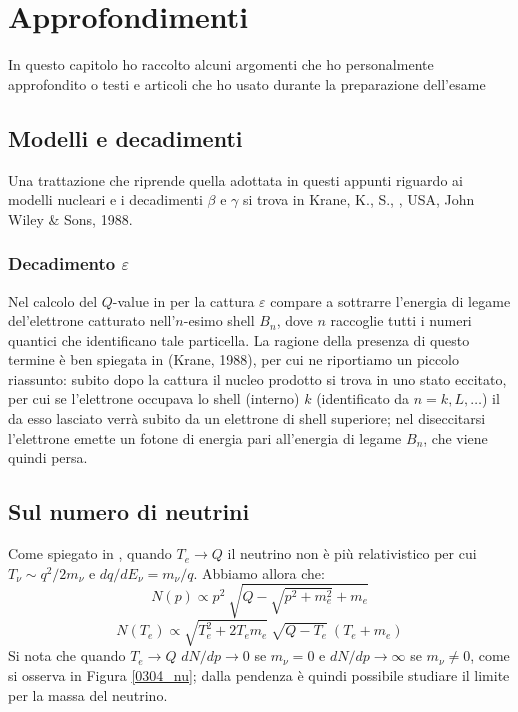 
\chapter{Approfondimenti}\label{complementi}

In questo capitolo ho raccolto alcuni argomenti che ho personalmente approfondito o testi e articoli che ho usato durante la preparazione dell'esame 

\section{Modelli e decadimenti}\label{compl-krane}
Una trattazione che riprende quella adottata in questi appunti riguardo ai modelli nucleari e i decadimenti $\beta$ e $\gamma$ si trova in Krane, K., S., \textit{}, USA, John Wiley \& Sons, 1988.
\subsection{Decadimento $\varepsilon$}\label{compl-epsilon}
Nel calcolo del $Q$-value in  per la cattura $\varepsilon$ compare a sottrarre l'energia di legame del'elettrone catturato nell'$n$-esimo shell $B_n$, dove $n$ raccoglie tutti i numeri quantici che identificano tale particella. La ragione della presenza di questo termine è ben spiegata in (Krane, 1988), per cui ne riportiamo un piccolo riassunto: subito dopo la cattura il nucleo prodotto si trova in uno stato eccitato, per cui se l'elettrone occupava lo shell (interno) $k$ (identificato da $n=k,L,\dots$) il  da esso lasciato verrà subito  da un elettrone di shell superiore; nel diseccitarsi l'elettrone emette un fotone di energia pari all'energia di legame $B_n$, che viene quindi persa.

\section{Sul numero di neutrini}\label{compl-neutrini}
Come spiegato in , quando $T_e \to Q$ il neutrino non è più relativistico per cui $T_\nu\sim q^2/2m_\nu$ e $dq/dE_\nu = m_\nu/q$. Abbiamo allora che:
$$N(p)\propto p^2 \: \sqrt{Q-\sqrt{p^2+m_e^2} + m_e}$$ 
$$N(T_e)\propto \sqrt{T_e^2+2T_em_e} \: \sqrt{Q-T_e} \: (T_e+m_e)$$
Si nota che quando $T_e\to Q$ $dN/dp\to 0$ se $m_\nu = 0$ e $dN/dp\to \infty$ se $m_\nu \not = 0$, come si osserva in Figura \ref{0304_nu}; dalla pendenza è quindi possibile studiare il limite per la massa del neutrino.


